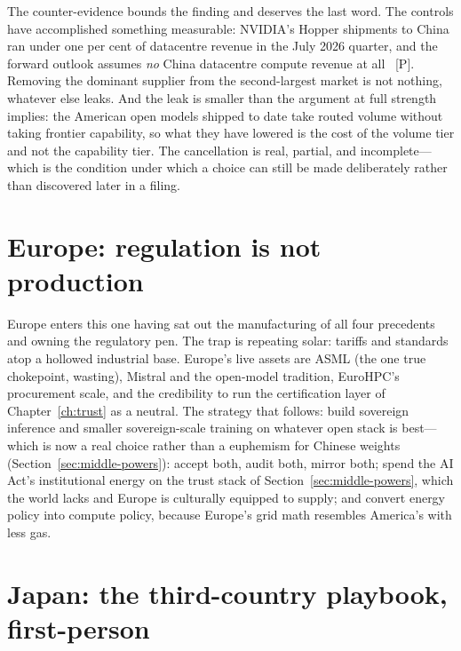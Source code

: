 The counter-evidence bounds the finding and deserves the last word. The controls have accomplished something measurable: NVIDIA's Hopper shipments to China ran under one per cent of datacentre revenue in the July 2026 quarter, and the forward outlook assumes \emph{no} China datacentre compute revenue at all~\cite{nvda-segments} [P]. Removing the dominant supplier from the second-largest market is not nothing, whatever else leaks. And the leak is smaller than the argument at full strength implies: the American open models shipped to date take routed volume without taking frontier capability, so what they have lowered is the cost of the volume tier and not the capability tier. The cancellation is real, partial, and incomplete---which is the condition under which a choice can still be made deliberately rather than discovered later in a filing.

\section{Europe: regulation is not production}

Europe enters this one having sat out the manufacturing of all four precedents and owning the regulatory pen. The trap is repeating solar: tariffs and standards atop a hollowed industrial base. Europe's live assets are ASML (the one true chokepoint, wasting), Mistral and the open-model tradition, EuroHPC's procurement scale, and the credibility to run the certification layer of Chapter~\ref{ch:trust} as a neutral. The strategy that follows: build sovereign inference and smaller sovereign-scale training on whatever open stack is best---which is now a real choice rather than a euphemism for Chinese weights (Section~\ref{sec:middle-powers}): accept both, audit both, mirror both; spend the AI Act's institutional energy on the trust stack of Section~\ref{sec:middle-powers}, which the world lacks and Europe is culturally equipped to supply; and convert energy policy into compute policy, because Europe's grid math resembles America's with less gas.

\section{Japan: the third-country playbook, first-person}

